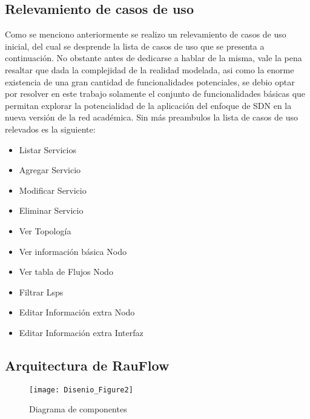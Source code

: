 \newpage
\subsection[Relevamiento de casos de uso]{Relevamiento de casos de uso}

Como se menciono anteriormente se realizo un relevamiento de casos de uso inicial, del cual se desprende la lista de casos de uso que se presenta a continuaci\'on. No obstante antes de dedicarse a hablar de la misma, vale la pena resaltar que dada la complejidad de la realidad modelada, asi como la enorme existencia de una gran cantidad de funcionalidades potenciales, se debio optar por resolver en este trabajo solamente el conjunto de funcionalidades b\'asicas que permitan explorar la potencialidad de la aplicaci\'on del enfoque de SDN en la nueva versi\'on de la red acad\'emica. Sin m\'as preambulos la lista de casos de uso relevados es la siguiente:

\begin{itemize}
\item Listar Servicios
\item Agregar Servicio
\item Modificar Servicio
\item Eliminar Servicio
\item Ver Topolog\'ia
\item Ver informaci\'on b\'asica Nodo
\item Ver tabla de Flujos Nodo
\item Filtrar Lsps
\item Editar Informaci\'on extra Nodo
\item Editar Informaci\'on extra Interfaz
\end{itemize}

\newpage
\subsection[Arquitectura de RauFlow]{Arquitectura de RauFlow}

\begin{figure}[ht!] 
\centering    
\texttt{[image: Disenio\_Figure2]}
\caption[Diagrama de componentes]{Diagrama de componentes}
\label{fig:ModeloDeDominio}
\end{figure}

